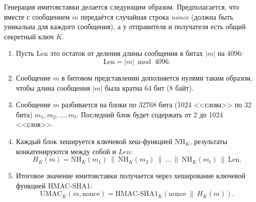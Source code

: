Генерация имитовставки делается следующим образом. Предполагается, что вместе с сообщением $m$ передаётся случайная строка \emph{nonce} (должна быть уникальна для каждого сообщения), а у отправителя и получателя есть общий секретный ключ $K$.

\begin{enumerate}
    \item Пусть Len это остаток от деления длины сообщения в битах $|m|$ на 4096:\[
        \textrm{Len} = |m| \bmod 4096.
    \]
    \item Сообщение $m$ в битовом представлении дополняется нулями таким образом, чтобы длина сообщения $|m|$ была кратна 64 бит (8 байт).
    \item Сообщение $m$ разбивается на блоки по 32768 бита (1024 <<слова>> по 32 бита) $m_1, m_2, \dots, m_t$. Последний блок будет содержать от 2 до 1024 <<слов>>.
    \item Каждый блок хешируется ключевой хеш-функцией $\textrm{NH}_K$, результаты конкатенируются между собой и $Len$:\[
        H_K(m) = \textrm{NH}_K (m_1) ~ \| ~ \textrm{NH}_K (m_2) ~ \| ~ \dots ~ \| ~ \textrm{NH}_K (m_t) ~ \| ~ \textrm{Len}.
    \]
    \item Итоговое значение имитовставки получается через хеширование ключевой функцией HMAC-SHA1:\[
        \textrm{UMAC}_K( m, \textrm{nonce} ) = \textrm{HMAC-SHA1}_K( \textrm{nonce} ~ \| ~ H_K(m) ).
    \]
\end{enumerate}
